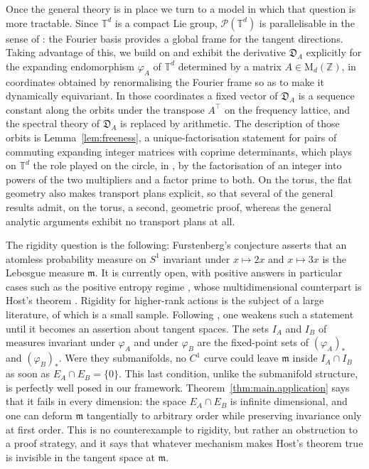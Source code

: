 \documentclass[11pt,reqno]{amsart}
\theoremstyle{plain}
\theoremstyle{definition}
\newcommand{\T}{\mathbb{T}}
\newcommand{\Z}{\mathbb{Z}}
\newcommand{\Leb}{\mathfrak{m}}
\newcommand{\D}{\mathfrak{D}}
\newcommand{\Prob}{\mathcal{P}}
\begin{document}
Once the general theory is in place we turn to a model in which that question is more tractable.
Since \( \T^d \) is a compact Lie group, \( \Prob(\T^d) \) is parallelisable in the sense of \cite[\S4]{gomes_differential_2024}: the Fourier basis provides a global frame for the tangent directions.
Taking advantage of this, we build on \cite{kloeckner_optimal_2013} and exhibit the derivative \( \D_A \) explicitly for the expanding endomorphism \( \varphi_A \) of \( \T^d \) determined by a matrix \( A\in\mathrm M_d(\Z) \), in coordinates obtained by renormalising the Fourier frame so as to make it dynamically equivariant.
In those coordinates a fixed vector of \( \D_A \) is a sequence constant along the orbits under the transpose \( A^\top \) on the frequency lattice, and the spectral theory of \( \D_A \) is replaced by arithmetic.
The description of those orbits is Lemma~\ref{lem:freeness}, a unique-factorisation statement for pairs of commuting expanding integer matrices with coprime determinants, which plays on \( \T^d \) the role played on the circle, in \cite[\S7]{kloeckner_optimal_2013_preprint}, by the factorisation of an integer into powers of the two multipliers and a factor prime to both.
On the torus, the flat geometry also makes transport plans explicit, so that several of the general results admit, on the torus, a second, geometric proof, whereas the general analytic arguments exhibit no transport plans at all.

The rigidity question is the following: Furstenberg's conjecture \cite{furstenberg_disjointness_1967} asserts that an atomless probability measure on \( S^1 \) invariant under \( x\mapsto2x \) and \( x\mapsto3x \) is the Lebesgue measure \(\Leb\).
It is currently open, with positive answers in particular cases such as the positive entropy regime \cite{rudolph_x2x3_1990}, whose multidimensional counterpart is Host's theorem \cite[Theorem 3]{host_uniform_2000}.
Rigidity for higher-rank actions is the subject of a large literature, of which \cite{berend_multi_1983,katok_invariant_1996,einsiedler_invariant_2006} is a small sample.
Following \cite[\S1.4]{kloeckner_optimal_2013_preprint}, one weakens such a statement until it becomes an assertion about tangent spaces.
The sets \( I_A \) and \( I_B \) of measures invariant under \( \varphi_A \) and under \( \varphi_B \) are the fixed-point sets of \( (\varphi_A)_\ast \) and \( (\varphi_B)_\ast \).
Were they submanifolds, no \( C^1 \) curve could leave \( \Leb \) inside \( I_A\cap I_B \) as soon as \( E_A\cap E_B=\{0\} \).
This last condition, unlike the submanifold structure, is perfectly well posed in our framework.
Theorem~\ref{thm:main.application} says that it fails in every dimension: the space \( E_A\cap E_B \) is infinite dimensional, and one can deform \(\Leb\) tangentially to arbitrary order while preserving invariance only at first order.
This is no counterexample to rigidity, but rather an obstruction to a proof strategy, and it says that whatever mechanism makes Host's theorem true is invisible in the tangent space at \( \Leb \).
\end{document}
